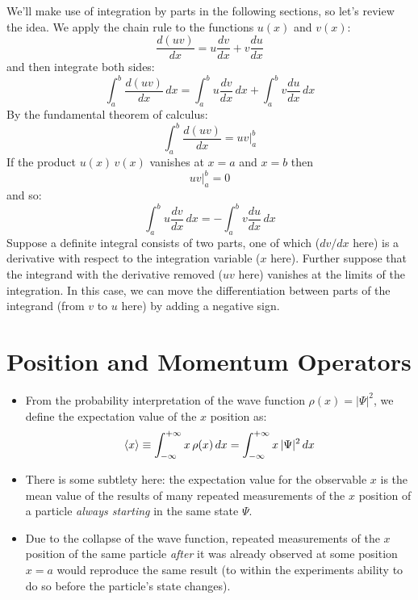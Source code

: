 \documentclass[12pt]{book}
\begin{document}
We'll make use of integration by parts in the following sections, so let's review the idea.  We apply the chain rule to the functions $u(x)$ and $v(x)$:
$$\frac{d(uv)}{dx} = u\frac{dv}{dx} + v\frac{du}{dx}$$
and then integrate both sides:
$$\int_a^b\frac{d(uv)}{dx} \, dx = \int_a^b u \frac{dv}{dx} \, dx + \int_a^bv\frac{du}{dx} \, dx$$
By the fundamental theorem of calculus:
$$\int_a^b\frac{d(uv)}{dx} = \left. uv \right\rvert_{a}^{b}$$
If the product $u(x)\,v(x)$ vanishes at $x = a$ and $x = b$ then
$$\left.uv \right\rvert_{a}^{b} = 0$$
and so:
\begin{equation}
\label{eqn:intparts}
\int_{a}^{b} u \frac{dv}{dx} \, dx =  - \int_{a}^{b} v \frac{du}{dx} \, dx
\end{equation}
Suppose a definite integral consists of two parts, one of which ($dv/dx$ here) is a derivative with respect to the integration variable ($x$ here).  Further suppose that the integrand with the derivative removed ($uv$ here) vanishes at the limits of the integration.  In this case, we can move the differentiation between parts of the integrand (from $v$ to $u$ here) by adding a negative sign.

\section{Position and Momentum Operators}
\begin{itemize}
\item  From the probability interpretation of the wave function $\rho(x) = | \Psi | ^2$, we define the expectation value of the $x$ position as:
$$\braket{x} \equiv \int_{-\infty}^{+\infty} x \, \rho(x) \,dx = \int_{-\infty}^{+\infty} x \, |\Psi|^2 \,dx$$
\item There is some subtlety here: the expectation value for the observable $x$ is the mean value of the results of many repeated measurements of the $x$ position of a particle {\em always starting} in the same state $\Psi$.  
\item Due to the collapse of the wave function, repeated measurements of the $x$ position of the same particle {\em after} it was already observed at some position $x=a$ would reproduce the same result (to within the experiments ability to do so before the particle's state changes).
\end{itemize}
\end{document}
